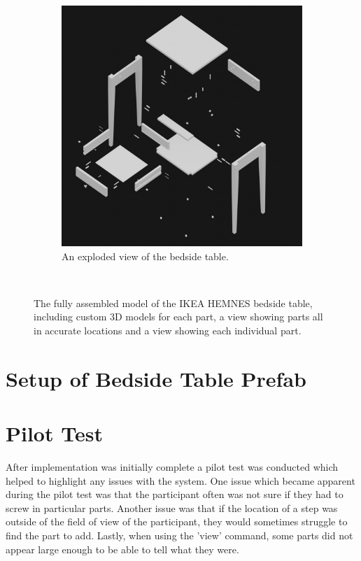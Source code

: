 \documentclass{l4proj}
\begin{document}
\begin{figure}[hbt!]
\begin{subfigure}[b]{0.45\textwidth}
        \includegraphics[width=\textwidth]{dissertation/images/explodedModel.jpg}
        \caption{An exploded view of the bedside table.}
        \label{fig:syn2}
    \end{subfigure}
    ~ %
    \caption{The fully assembled model of the IKEA HEMNES bedside table, including custom 3D models for each part, a view showing parts all in accurate locations and a view showing each individual part.}
    \label{fig:explode}
\end{figure}


\section{Setup of Bedside Table Prefab}

\section{Pilot Test}

After implementation was initially complete a pilot test was conducted which helped to highlight any issues with the system. One issue which became apparent during the pilot test was that the participant often was not sure if they had to screw in particular parts. Another issue was that if the location of a step was outside of the field of view of the participant, they would sometimes struggle to find the part to add. Lastly, when using the 'view' command, some parts did not appear large enough to be able to tell what they were.
\end{document}
